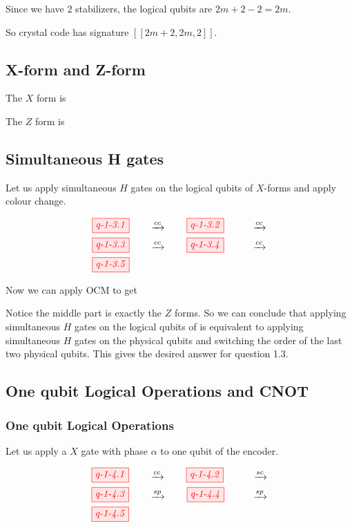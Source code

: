 Since we have 2 stabilizers, the logical qubits are $2m+2 -2 = 2m$.

So crystal code has signature $[[2m+2, 2m, 2]]$.

\subsection{X-form and Z-form}

The $X$ form is 

The $Z$ form is 

\subsection{Simultaneous H gates}

Let us apply simultaneous $H$ gates on the logical qubits of $X$-forms and apply colour change.


\begin{align*}
	\tikzfig{q-1-3.1} \qquad &\xrightarrow{cc}  \qquad \tikzfig{q-1-3.2}  \qquad &\xrightarrow{cc}  \\
	\tikzfig{q-1-3.3} \qquad &\xrightarrow{cc}  \qquad \tikzfig{q-1-3.4}  \qquad &\xrightarrow{cc}  \\
	\tikzfig{q-1-3.5} \qquad 
\end{align*}

Now we can apply OCM to get 

Notice the middle part is exactly the $Z$ forms. 
So we can conclude that applying simultaneous $H$ gates on the logical qubits of is equivalent to applying simultaneous $H$ gates on the physical qubits and switching the order of the last two physical qubits.
This gives the desired answer for question 1.3.


\subsection{One qubit Logical Operations and CNOT}

\subsubsection{One qubit Logical Operations}

Let us apply a $X$ gate with phase $\alpha$ to one qubit of the encoder.

\begin{align*}
	\tikzfig{q-1-4.1} \qquad &\xrightarrow{cc}  \qquad \tikzfig{q-1-4.2}  \qquad &\xrightarrow{sc}  \\
	\tikzfig{q-1-4.3} \qquad &\xrightarrow{sp}  \qquad \tikzfig{q-1-4.4}  \qquad &\xrightarrow{sp}  \\
	\tikzfig{q-1-4.5} \qquad 
\end{align*}

